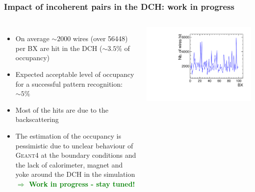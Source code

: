 \documentclass[aspectratio=169, hyperref={colorlinks=true,pdfpagelabels=false,linkcolor=black}, xcolor=dvipsnames,10pt]{beamer}
\begin{document}
\begin{frame}
	\frametitle{Impact of incoherent pairs in the DCH: work in progress}

	\begin{columns}
		\begin{itemize}
		\item On average $\sim2000$ wires (over 56448) per BX are hit in the DCH ($\sim3.5\%$ of occupancy) \vspace{0.2cm}
		\item Expected acceptable level of occupancy for a successful pattern recognition: $\sim5\%$ \vspace{0.2cm}
		\item Most of the hits are due to the backscattering   \vspace{0.2cm}
		\item The estimation of the occupancy is pessimistic due to unclear behaviour of \textsc{Geant4} at the boundary conditions and the lack of calorimeter, magnet and yoke around the DCH in the simulation \\
		\textbf{\textcolor{Green}{$\Rightarrow$ Work in progress - stay tuned!}}
		\end{itemize}	
	
	\centering
	\includegraphics[width=\textwidth]{../figures/DCH/differentWires_hit_perBX.pdf}

	\end{columns}
	
\end{frame}
\end{document}
